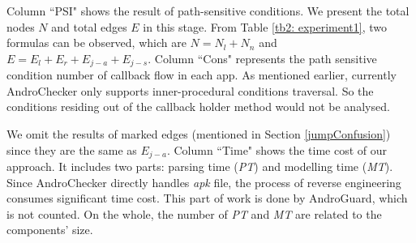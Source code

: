 %
Column ``PSI" shows the result of path-sensitive conditions. We present the total nodes $N$ and total edges $E$ in this stage. From Table \ref{tb2: experiment1}, two formulas can be observed, which are $N = N_{l} + N_{n}$ and $E = E_{l} + E_{r} + E_{j-a} + E_{j-s}$. Column ``Cons" represents the path sensitive condition number of callback flow in each app. As mentioned earlier, currently AndroChecker only supports inner-procedural conditions traversal. So the conditions residing out of the callback holder method would not be analysed. 

We omit the results of marked edges (mentioned in Section \ref{jumpConfusion}) since they are the same as $E_{j-a}$. Column ``Time" shows the time cost of our approach. It includes two parts: parsing time (\textit{PT}) and modelling time (\textit{MT}). Since AndroChecker directly handles \textit{apk} file, the process of reverse engineering consumes significant time cost. This part of work is done by AndroGuard, which is not counted. On the whole, the number of \textit{PT} and \textit{MT} are related to the components' size. 

